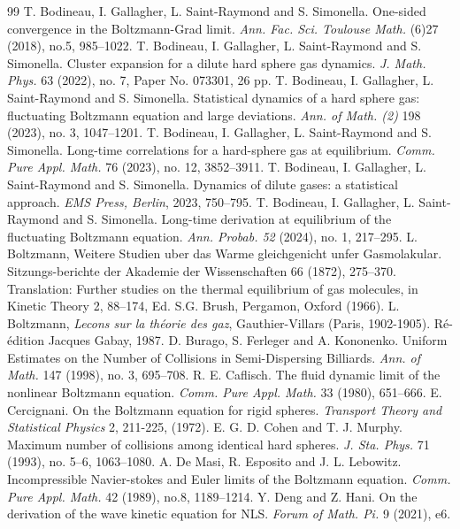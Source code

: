 \documentclass[10pt, reqno]{amsart}
\theoremstyle{definition}
\theoremstyle{remark}
\numberwithin{equation}{section}
\begin{document}
\begin{thebibliography}{99}
 T. Bodineau, I. Gallagher, L. Saint-Raymond and S. Simonella. One-sided convergence in the Boltzmann-Grad limit. \emph{Ann. Fac. Sci. Toulouse Math.} (6)27 (2018), no.5, 985--1022.
 T. Bodineau, I. Gallagher, L. Saint-Raymond and S. Simonella. Cluster expansion for a dilute hard sphere gas dynamics. \emph{J. Math. Phys.} 63 (2022), no. 7, Paper No. 073301, 26 pp.
 T. Bodineau, I. Gallagher, L. Saint-Raymond and S. Simonella. Statistical dynamics of a hard sphere gas: fluctuating Boltzmann equation and large deviations. \emph{Ann. of Math. (2)} 198 (2023), no. 3, 1047--1201.
 T. Bodineau, I. Gallagher, L. Saint-Raymond and S. Simonella. Long-time correlations for a hard-sphere gas at equilibrium. \emph{Comm. Pure Appl. Math.} 76 (2023), no. 12, 3852--3911.
 T. Bodineau, I. Gallagher, L. Saint-Raymond and S. Simonella. Dynamics of dilute gases: a statistical approach. \emph{EMS Press, Berlin}, 2023, 750--795.
 T. Bodineau, I. Gallagher, L. Saint-Raymond and S. Simonella. Long-time derivation at equilibrium of the fluctuating Boltzmann equation. \emph{Ann. Probab. 52} (2024), no. 1, 217--295.
 L. Boltzmann, Weitere Studien uber das Warme gleichgenicht unfer Gasmolakular. Sitzungs-berichte der Akademie der Wissenschaften 66 (1872), 275--370. Translation: Further studies on the thermal equilibrium of gas molecules, in Kinetic Theory 2, 88--174, Ed. S.G. Brush, Pergamon, Oxford (1966).
 L. Boltzmann, \emph{Lecons sur la th\'{e}orie des gaz}, Gauthier-Villars (Paris, 1902-1905). R\'{e}-\'{e}dition Jacques Gabay, 1987.
 D. Burago, S. Ferleger and A. Kononenko. Uniform Estimates on the Number of Collisions in Semi-Dispersing Billiards. \emph{Ann. of Math.} 147 (1998), no. 3, 695--708.
 R. E. Caflisch. The fluid dynamic limit of the nonlinear Boltzmann equation. \emph{Comm. Pure Appl. Math.} 33 (1980), 651--666.
 E. Cercignani. On the Boltzmann equation for rigid spheres. \emph{Transport Theory and Statistical Physics} 2, 211-225, (1972).
 E. G. D. Cohen and T. J. Murphy. Maximum number of collisions among identical hard spheres. \emph{J. Sta. Phys.} 71 (1993), no. 5--6, 1063--1080.
 A. De Masi, R. Esposito and J. L. Lebowitz. Incompressible Navier-stokes and Euler limits of the Boltzmann equation. \emph{Comm. Pure Appl. Math.} 42 (1989), no.8, 1189--1214.
 Y. Deng and Z. Hani. On the derivation of the wave kinetic equation for NLS. \emph{Forum of Math. Pi.} 9 (2021), e6.

\end{thebibliography}
\end{document}
